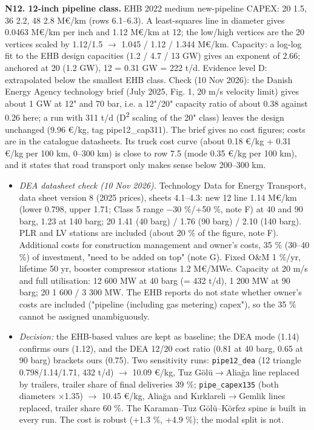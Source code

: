 \documentclass[11pt,a4paper]{article}
\begin{document}
\textbf{N12. 12-inch pipeline class.} EHB 2022 medium new-pipeline CAPEX: 20\textquotedbl{} 1.5, 36\textquotedbl{} 2.2, 48\textquotedbl{} 2.8 M\euro{}/km (rows 6.1--6.3). A least-squares line in diameter gives 0.0463 M\euro{}/km per inch and 1.12 M\euro{}/km at 12\textquotedbl{}; the low/high vertices are the 20\textquotedbl{} vertices scaled by 1.12/1.5 $\rightarrow$ 1.045 / 1.12 / 1.344 M\euro{}/km. Capacity: a log-log fit to the EHB design capacities (1.2 / 4.7 / 13 GW) gives an exponent of 2.66; anchored at 20\textquotedbl{} (1.2 GW), 12\textquotedbl{} = 0.31 GW = 222 t/d. Evidence level D: extrapolated below the smallest EHB class. Check (10 Nov 2026): the Danish Energy Agency technology brief (July 2025, Fig. 1, 20 m/s velocity limit) gives about 1 GW at 12" and 70 bar, i.e. a 12"/20" capacity ratio of about 0.38 against 0.26 here; a run with 311 t/d (D\textsuperscript{2} scaling of the 20" class) leaves the design unchanged (9.96 \euro{}/kg, tag pipe12\_cap311). The brief gives no cost figures; costs are in the catalogue datasheets. Its truck cost curve (about 0.18 \euro{}/kg + 0.31 \euro{}/kg per 100 km, 0--300 km) is close to row 7.5 (mode 0.35 \euro{}/kg per 100 km), and it states that road transport only makes sense below 200--300 km.

\begin{itemize}\setlength\itemsep{1pt}

  \item \textit{DEA datasheet check (10 Nov 2026).} Technology Data for Energy Transport, data sheet version 8 (2025 prices), sheets 4.1--4.3: new 12\textquotedbl{} line 1.14 M\euro{}/km (lower 0.798, upper 1.71; Class 5 range $-$30 \%/+50 \%, note F) at 40 and 90 barg, 1.23 at 140 barg; 20\textquotedbl{} 1.41 (40 barg) / 1.76 (90 barg) / 2.10 (140 barg). PLR and LV stations are included (about 20 \% of the figure, note F). Additional costs for construction management and owner's costs, 35 \% (30--40 \%) of investment, "need to be added on top" (note G). Fixed O\&M 1 \%/yr, lifetime 50 yr, booster compressor stations 1.2 M\euro{}/MWe. Capacity at 20 m/s and full utilisation: 12\textquotedbl{} 600 MW at 40 barg (= 432 t/d), 1 200 MW at 90 barg; 20\textquotedbl{} 1 600 / 3 300 MW. The EHB reports do not state whether owner's costs are included ("pipeline (including gas metering) capex"), so the 35 \% cannot be assigned unambiguously.

  \item \textit{Decision:} the EHB-based values are kept as baseline; the DEA mode (1.14) confirms ours (1.12), and the DEA 12\textquotedbl{}/20\textquotedbl{} cost ratio (0.81 at 40 barg, 0.65 at 90 barg) brackets ours (0.75). Two sensitivity runs: \texttt{pipe12\_dea} (12\textquotedbl{} triangle 0.798/1.14/1.71, 432 t/d) $\rightarrow$ 10.09 \euro{}/kg, Tuz Gölü$\rightarrow$Aliağa line replaced by trailers, trailer share of final deliveries 39 \%; \texttt{pipe\_capex135} (both diameters $\times$1.35) $\rightarrow$ 10.45 \euro{}/kg, Aliağa and Kırklareli$\rightarrow$Gemlik lines replaced, trailer share 60 \%. The Karaman--Tuz Gölü--Körfez spine is built in every run. The cost is robust (+1.3 \%, +4.9 \%); the modal split is not.

\end{itemize}
\end{document}
